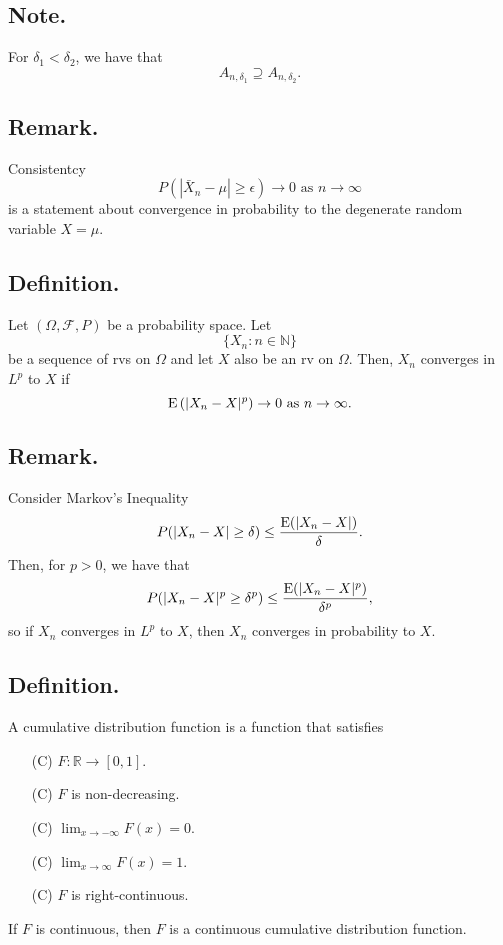 \documentclass[titlepage]{article}
\begin{document}
\subsection{Note.} For $\delta_{1} < \delta_{2}$, we have that 
$$A_{n,\delta_{1}} \supseteq A_{n,\delta_{2}}.$$

\subsection{Remark.} Consistentcy 
$$P\left(|\bar{X}_{n} - \mu| \geq \epsilon\right) \to 0 \text{ as } n \to \infty$$
is a statement about convergence in probability to the degenerate random variable $X = \mu$.

\subsection{Definition.} Let $(\Omega, \mathcal{F}, P)$ be a probability space. Let
$$\{X_{n}: n \in \mathbb{N}\}$$
be a sequence of rvs on $\Omega$ and let $X$ also be an rv on $\Omega$. Then, $X_{n}$ converges in $L^{p}$ to $X$ if
$$\text{E}\left(|X_{n} - X|^{p}\right) \to 0 \text{ as } n \to \infty.$$

\subsection{Remark.} Consider Markov's Inequality 
$$P(|X_{n} - X| \geq \delta) \leq \frac{\text{E}(|X_{n} - X|)}{\delta}.$$
Then, for $p > 0$, we have that 
$$P(|X_{n} - X|^{p} \geq \delta^{p}) \leq \frac{\text{E}(|X_{n} - X|^{p})}{\delta^{p}},$$
so if $X_{n}$ converges in $L^{p}$ to $X$, then $X_{n}$ converges in probability to $X$.

\subsection{Definition.} A cumulative distribution function is a function that satisfies 
\begin{enumerate}
\item[(C)] $F: \mathbb{R} \to [0, 1]$.
\item[(C)] $F$ is non-decreasing.
\item[(C)] $\lim_{x \to -\infty}F(x) = 0$.
\item[(C)] $\lim_{x \to \infty}F(x) = 1$.
\item[(C)] $F$ is right-continuous.
\end{enumerate}
If $F$ is continuous, then $F$ is a continuous cumulative distribution function.
\end{document}
